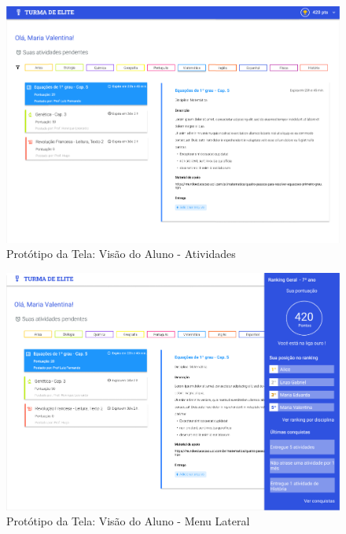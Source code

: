 \begin{apendicesenv}
\begin{figure}[htb]
    \centering
	\includegraphics[width=16cm]{imagens/Aluno-Atividades.png}
	\caption{\label{fig:aluno} Protótipo da Tela: Visão do Aluno - Atividades}
\end{figure}
\FloatBarrier

\begin{figure}[htb]
    \centering
	\includegraphics[width=16cm]{imagens/Aluno-MenuLateral.png}
	\caption{\label{fig:menu-lateral} Protótipo da Tela: Visão do Aluno - Menu Lateral}
\end{figure}
\FloatBarrier


\end{apendicesenv}
